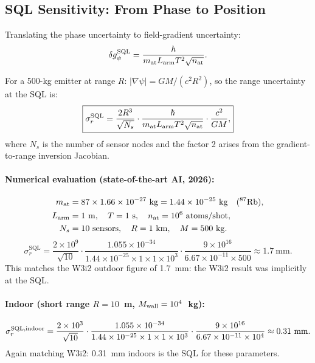 \documentclass[aps,prd,twocolumn,superscriptaddress,nofootinbib]{revtex4-2}
\newcommand{\SQL}{\mathrm{SQL}}
\begin{document}
\subsection{SQL Sensitivity: From Phase to Position}

Translating the phase uncertainty to field-gradient uncertainty:
\begin{equation}
  \delta g_{\psi}^{\SQL} = \frac{\hbar}{m_{\rm at} L_{\rm arm} T^2 \sqrt{n_{\rm at}}}.
  \label{eq:sql-g}
\end{equation}

For a 500-kg emitter at range $R$:
$|\nabla\psi| = GM/(c^2 R^2)$, so the range uncertainty at the SQL is:
\begin{equation}
  \boxed{
  \sigma_r^{\SQL} = \frac{2R^3}{\sqrt{N_s}} \cdot
  \frac{\hbar}{m_{\rm at} L_{\rm arm} T^2 \sqrt{n_{\rm at}}}
  \cdot \frac{c^2}{GM},
  }
  \label{eq:sql-position}
\end{equation}
where $N_s$ is the number of sensor nodes and the factor 2 arises from
the gradient-to-range inversion Jacobian.

\paragraph{Numerical evaluation (state-of-the-art AI, 2026):}
\begin{align}
  m_{\rm at} &= 87 \times 1.66\times10^{-27}~\mathrm{kg}
               = 1.44\times10^{-25}~\mathrm{kg} \quad (^{87}\mathrm{Rb}), \\
  L_{\rm arm} &= 1~\mathrm{m}, \quad
  T = 1~\mathrm{s}, \quad
  n_{\rm at} = 10^6~\mathrm{atoms/shot}, \\
  N_s &= 10~\mathrm{sensors}, \quad
  R = 1~\mathrm{km}, \quad
  M = 500~\mathrm{kg}.
\end{align}
\begin{equation}
  \sigma_r^{\SQL} = \frac{2\times10^9}{{\sqrt{10}}}
  \cdot \frac{1.055\times10^{-34}}
  {1.44\times10^{-25}\times1\times1\times10^3}
  \cdot \frac{9\times10^{16}}{6.67\times10^{-11}\times500}
  \approx 1.7~\mathrm{mm}.
  \label{eq:sql-outdoor}
\end{equation}
This matches the W3i2 outdoor figure of 1.7~mm: the W3i2 result
was implicitly at the SQL.

\paragraph{Indoor (short range $R = 10$~m, $M_{\rm wall} = 10^4$~kg):}
\begin{equation}
  \sigma_r^{\SQL,\rm indoor} = \frac{2\times10^3}{{\sqrt{10}}}
  \cdot \frac{1.055\times10^{-34}}
  {1.44\times10^{-25}\times1\times1\times10^3}
  \cdot \frac{9\times10^{16}}{6.67\times10^{-11}\times10^4}
  \approx 0.31~\mathrm{mm}.
  \label{eq:sql-indoor}
\end{equation}
Again matching W3i2: 0.31~mm indoors is the SQL for these parameters.
\end{document}
